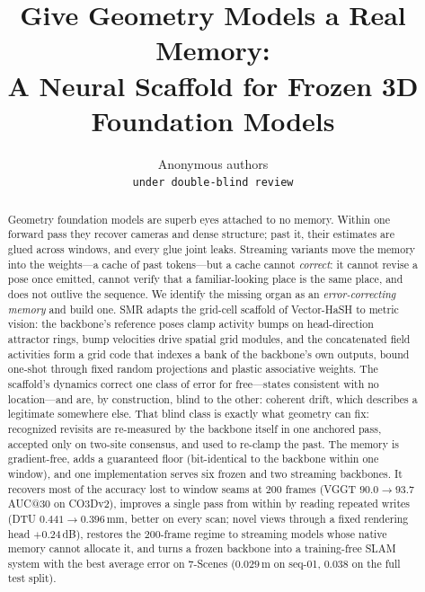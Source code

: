 \documentclass{article}
\title{Give Geometry Models a Real Memory:\\A Neural Scaffold for Frozen 3D Foundation Models}
\author{Anonymous authors\\ \texttt{under double-blind review}}
\newcommand{\smr}{\textsc{SMR}}
\begin{document}
\maketitle

\begin{abstract}
Geometry foundation models are superb eyes attached to no memory. Within
one forward pass they recover cameras and dense structure; past it, their
estimates are glued across windows, and every glue joint leaks. Streaming
variants move the memory into the weights---a cache of past tokens---but a
cache cannot \emph{correct}: it cannot revise a pose once emitted, cannot
verify that a familiar-looking place is the same place, and does not
outlive the sequence. We identify the missing organ as an
\emph{error-correcting memory} and build one. \smr{} adapts the grid-cell
scaffold of Vector-HaSH to metric vision: the backbone's reference poses
clamp activity bumps on head-direction attractor rings, bump velocities
drive spatial grid modules, and the concatenated field activities form a
grid code that indexes a bank of the backbone's own outputs, bound one-shot
through fixed random projections and plastic associative weights. The
scaffold's dynamics correct one class of error for free---states consistent
with no location---and are, by construction, blind to the other: coherent
drift, which describes a legitimate somewhere else. That blind class is
exactly what geometry can fix: recognized revisits are re-measured by the
backbone itself in one anchored pass, accepted only on two-site consensus,
and used to re-clamp the past. The memory is gradient-free, adds a
guaranteed floor (bit-identical to the backbone within one window), and one
implementation serves six frozen and two streaming backbones. It recovers
most of the accuracy lost to window seams at $200$ frames (VGGT
$90.0\!\to\!93.7$ AUC@30 on CO3Dv2), improves a single pass from within by
reading repeated writes (DTU $0.441\!\to\!0.396$\,mm, better on every
scan; novel views through a fixed rendering head ${+}0.24$\,dB), restores the
$200$-frame regime to streaming models whose native
memory cannot allocate it, and turns a frozen backbone into a training-free
SLAM system with the best average error on 7-Scenes ($0.029$\,m on seq-01,
$0.038$ on the full test split).
\end{abstract}
\end{document}
